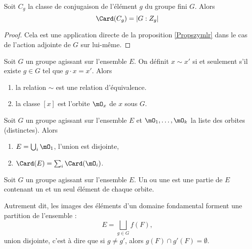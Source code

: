 \begin{corollary}
    Soit \( C_g\) la classe de conjugaison de l'élément  \( g\) du groupe fini \( G\). Alors
    \begin{equation}
        \Card(C_g)=| G:Z_g |
    \end{equation}
\end{corollary}

\begin{proof}
    Cela est une application directe de la proposition \ref{Propszymlr} dans le cas de l'action adjointe de \( G\) sur lui-même.
\end{proof}

\begin{lemma}
    Soit \( G\) un groupe agissant sur l'ensemble \( E\). On définit \( x\sim x'\) si et seulement s'il existe \( g\in G\) tel que \( g\cdot x=x'\). Alors
    \begin{enumerate}
        \item
            la relation \( \sim\) est une relation d'équivalence.
        \item
            la classe \( [x]\) est l'orbite \( \mO_x\) de \( x\) sous \( G\).
    \end{enumerate}
\end{lemma}

\begin{corollary} \label{CorARFVMP}
    Soit \( G\) un groupe agissant sur l'ensemble \( E\) et \( \mO_1,\ldots, \mO_k  \) la liste des orbites (distinctes). Alors
    \begin{enumerate}
        \item
            \( E=\bigcup_i\mO_1\), l'union est disjointe,
        \item
            \( \Card(E)=\sum_i\Card(\mO_i)\).
    \end{enumerate}
\end{corollary}

\begin{definition}  \label{DefcSuYxz}
    Soit \( G\) un groupe agissant sur l'ensemble \( E\). Un  ou une  est une partie de \( E\) contenant un et un seul élément de chaque orbite.
\end{definition}
Autrement dit, les images des éléments d'un domaine fondamental forment une partition de l'ensemble :
\begin{equation}
    E=\bigsqcup_{g\in G}f(F),
\end{equation}
union disjointe, c'est à dire que si \( g\neq g'\), alors \( g(F)\cap g'(F)=\emptyset\).

